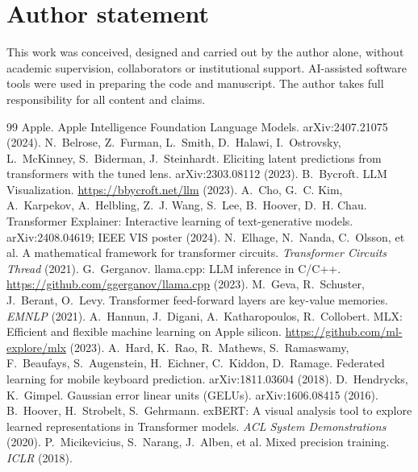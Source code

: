 \documentclass[11pt]{article}
\begin{document}
\section*{Author statement}
This work was conceived, designed and carried out by the author alone, without academic supervision, collaborators or institutional support. AI-assisted software tools were used in preparing the code and manuscript. The author takes full responsibility for all content and claims.

\begin{thebibliography}{99}
 Apple. Apple Intelligence Foundation Language Models. arXiv:2407.21075 (2024).
 N.~Belrose, Z.~Furman, L.~Smith, D.~Halawi, I.~Ostrovsky, L.~McKinney, S.~Biderman, J.~Steinhardt. Eliciting latent predictions from transformers with the tuned lens. arXiv:2303.08112 (2023).
 B.~Bycroft. LLM Visualization. \url{https://bbycroft.net/llm} (2023).
 A.~Cho, G.~C. Kim, A.~Karpekov, A.~Helbling, Z.~J. Wang, S.~Lee, B.~Hoover, D.~H. Chau. Transformer Explainer: Interactive learning of text-generative models. arXiv:2408.04619; IEEE VIS poster (2024).
 N.~Elhage, N.~Nanda, C.~Olsson, et al. A mathematical framework for transformer circuits. \emph{Transformer Circuits Thread} (2021).
 G.~Gerganov. llama.cpp: LLM inference in C/C++. \url{https://github.com/ggerganov/llama.cpp} (2023).
 M.~Geva, R.~Schuster, J.~Berant, O.~Levy. Transformer feed-forward layers are key-value memories. \emph{EMNLP} (2021).
 A.~Hannun, J.~Digani, A.~Katharopoulos, R.~Collobert. MLX: Efficient and flexible machine learning on Apple silicon. \url{https://github.com/ml-explore/mlx} (2023).
 A.~Hard, K.~Rao, R.~Mathews, S.~Ramaswamy, F.~Beaufays, S.~Augenstein, H.~Eichner, C.~Kiddon, D.~Ramage. Federated learning for mobile keyboard prediction. arXiv:1811.03604 (2018).
 D.~Hendrycks, K.~Gimpel. Gaussian error linear units (GELUs). arXiv:1606.08415 (2016).
 B.~Hoover, H.~Strobelt, S.~Gehrmann. exBERT: A visual analysis tool to explore learned representations in Transformer models. \emph{ACL System Demonstrations} (2020).
 P.~Micikevicius, S.~Narang, J.~Alben, et al. Mixed precision training. \emph{ICLR} (2018).

\end{thebibliography}
\end{document}
